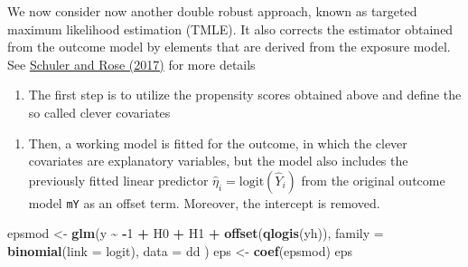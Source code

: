 \documentclass[
]{book}
\newenvironment{Shaded}{\begin{snugshade}}{\end{snugshade}}
\newcommand{\AttributeTok}[1]{\textcolor[rgb]{0.13,0.29,0.53}{#1}}
\newcommand{\DecValTok}[1]{\textcolor[rgb]{0.00,0.00,0.81}{#1}}
\newcommand{\FunctionTok}[1]{\textcolor[rgb]{0.13,0.29,0.53}{\textbf{#1}}}
\newcommand{\NormalTok}[1]{#1}
\newcommand{\OtherTok}[1]{\textcolor[rgb]{0.56,0.35,0.01}{#1}}
\newcommand{\SpecialCharTok}[1]{\textcolor[rgb]{0.81,0.36,0.00}{\textbf{#1}}}
\providecommand{\tightlist}{%
  \setlength{\itemsep}{0pt}\setlength{\parskip}{0pt}}
\begin{document}
We now consider now another double robust approach,
known as targeted maximum likelihood estimation (TMLE).
It also corrects the estimator obtained from the outcome model
by elements that are derived from the exposure model.
See \href{https://doi.org/10.1093/aje/kww165}{Schuler and Rose (2017)}
for more details

\begin{enumerate}
\def\labelenumi{\arabic{enumi}.}
\tightlist
\item
  The first step is to utilize the propensity scores obtained
  above and define the so called clever covariates
\end{enumerate}

\begin{Shaded}
\end{Shaded}

\begin{enumerate}
\def\labelenumi{\arabic{enumi}.}
\setcounter{enumi}{1}
\tightlist
\item
  Then, a working model is fitted for the outcome,
  in which the clever covariates
  are explanatory variables, but the model also includes
  the previously fitted linear predictor
  \(\widehat{\eta}_i = \text{logit}(\widehat Y_i)\)
  from the original outcome model \texttt{mY}
  as an offset term. Moreover, the intercept is removed.
\end{enumerate}

\begin{Shaded}
\begin{Highlighting}[]
\NormalTok{epsmod }\OtherTok{\textless{}{-}} \FunctionTok{glm}\NormalTok{(y }\SpecialCharTok{\textasciitilde{}} \SpecialCharTok{{-}}\DecValTok{1} \SpecialCharTok{+}\NormalTok{ H0 }\SpecialCharTok{+}\NormalTok{ H1 }\SpecialCharTok{+} \FunctionTok{offset}\NormalTok{(}\FunctionTok{qlogis}\NormalTok{(yh)),}
  \AttributeTok{family =} \FunctionTok{binomial}\NormalTok{(}\AttributeTok{link =}\NormalTok{ logit), }\AttributeTok{data =}\NormalTok{ dd}
\NormalTok{)}
\NormalTok{eps }\OtherTok{\textless{}{-}} \FunctionTok{coef}\NormalTok{(epsmod)}
\NormalTok{eps}
\end{Highlighting}
\end{Shaded}
\end{document}
